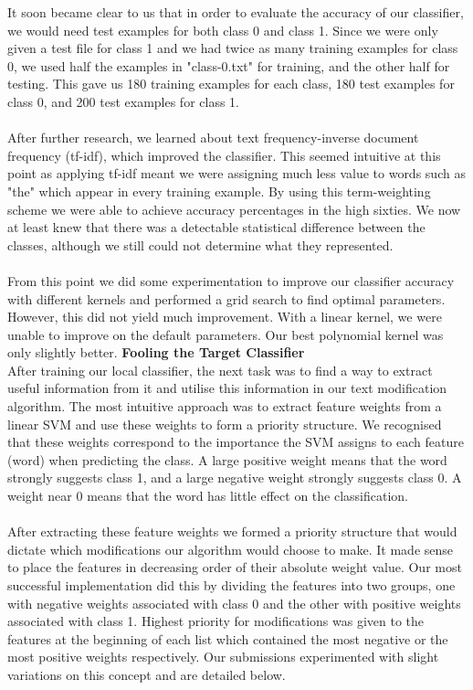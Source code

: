 \documentclass{article}
\begin{document}
It soon became clear to us that in order to evaluate the accuracy of our classifier, we would need test examples for both class 0 and class 1. Since we were only given a test file for class 1 and we had twice as many training examples for class 0, we used half the examples in "class-0.txt" for training, and the other half for testing. This gave us 180 training examples for each class, 180 test examples for class 0, and 200 test examples for class 1. \\ \\
After further research, we learned about text frequency-inverse document frequency (tf-idf), which improved the classifier. This seemed intuitive at this point as applying tf-idf meant we were assigning much less value to words such as "the" which appear in every training example. By using this term-weighting scheme we were able to achieve accuracy percentages in the high sixties. We now at least knew that there was a detectable statistical difference between the classes, although we still could not determine what they represented. \\ \\
From this point we did some experimentation to improve our classifier accuracy with different kernels and performed a grid search to find optimal parameters. However, this did not yield much improvement. With a linear kernel, we were unable to improve on the default parameters. Our best polynomial kernel was only slightly better.
\newpage
\textbf{\large Fooling the Target Classifier} \\
After training our local classifier, the next task was to find a way to extract useful information from it and utilise this information in our text modification algorithm. The most intuitive approach was to extract feature weights from a linear SVM and use these weights to form a priority structure. We recognised that these weights correspond to the importance the SVM assigns to each feature (word) when predicting the class. A large positive weight means that the word strongly suggests class 1, and a large negative weight strongly suggests class 0. A weight near 0 means that the word has little effect on the classification. \\ \\
After extracting these feature weights we formed a priority structure that would dictate which modifications our algorithm would choose to make. It made sense to place the features in decreasing order of their absolute weight value. Our most successful implementation did this by dividing the features into two groups, one with negative weights associated with class 0 and the other with positive weights associated with class 1. Highest priority for modifications was given to the features at the beginning of each list which contained the most negative or the most positive weights respectively. Our submissions experimented with slight variations on this concept and are detailed below. \\
\end{document}
